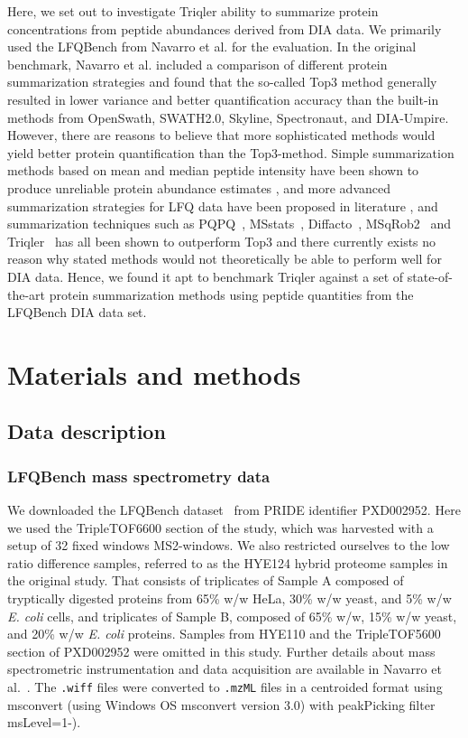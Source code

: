 \documentclass[10pt,letterpaper]{article}
\begin{document}
Here, we set out to investigate Triqler ability to summarize protein concentrations from peptide abundances derived from DIA data. We primarily used the LFQBench from Navarro et al. \cite{navarro2016multicenter} for the evaluation. In the original benchmark, Navarro et al. included a comparison of different protein summarization strategies and found that the so-called Top3 method generally resulted in lower variance and better quantification accuracy than the built-in methods from OpenSwath, SWATH2.0, Skyline, Spectronaut, and DIA-Umpire\cite{navarro2016multicenter}. However, there are reasons to believe that more sophisticated methods would yield better protein quantification than the Top3-method. Simple summarization methods based on mean and median peptide intensity have been shown to produce unreliable protein abundance estimates \cite{goeminne2015summarization}, and more advanced summarization strategies for LFQ data have been proposed in literature \cite{silva2006absolute,cox2014accurate}, and summarization techniques such as PQPQ~\cite{forshed2011enhanced}, MSstats~\cite{choi2014msstats}, Diffacto~\cite{zhang2017covariation}, MSqRob2~\cite{sticker2020robust} and Triqler~\cite{The2018Integrated} has all been shown to outperform Top3 and there currently exists no reason why stated methods would not theoretically be able to perform well for DIA data. Hence, we found it apt to benchmark Triqler against a set of state-of-the-art protein summarization methods using peptide quantities from the LFQBench DIA data set.
 
 
\section*{Materials and methods}


\subsection*{Data description}
\subsubsection*{LFQBench mass spectrometry data}


We downloaded the LFQBench dataset~\cite{navarro2016multicenter} from PRIDE identifier PXD002952. Here we used the TripleTOF6600 section of the study, which was harvested with a setup of 32 fixed windows MS2-windows. We also restricted ourselves to the low ratio difference samples, referred to as the HYE124 hybrid proteome samples in the original study. That consists of triplicates of Sample A composed of tryptically digested proteins from 65\% w/w HeLa, 30\% w/w yeast, and 5\% w/w \textit{E. coli} cells, and triplicates of Sample B, composed of 65\% w/w, 15\% w/w yeast, and 20\% w/w \textit{E. coli} proteins. Samples from HYE110 and the TripleTOF5600 section of PXD002952 were omitted in this study. Further details about mass spectrometric instrumentation and data acquisition are available in Navarro et al.~\cite{navarro2016multicenter}. The \verb|.wiff| files were converted to \verb|.mzML| files in a centroided format using msconvert (using Windows OS msconvert version 3.0) with peakPicking filter msLevel=1-). 
\end{document}
